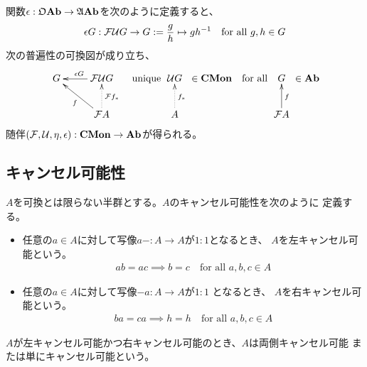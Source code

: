 	関数$\epsilon:{\mathfrak{O}}{\mathbf{Ab}}\to{\mathfrak{A}}{\mathbf{Ab}}$を次のように定義すると、
	\begin{equation*}\begin{split}
		\epsilon G: {\mathcal{F}}{\mathcal{U}} G\to G := \frac{g}{h} \mapsto gh^{-1} 
		\quad\text{for all } g,h\in G
	\end{split}\end{equation*}
	次の普遍性の可換図が成り立ち、
	\begin{equation*}\begin{split}
		\xymatrix{
			G \ar@{<-}[r]^{\epsilon G} \ar@{<-}[rd]_f 
			& \clF\clU G \ar@{<.}[d]^{\clF f_*} \\
			& \clF A
		} \quad\text{unique } \xymatrix{
			\clU G \ar@{<.}[d]^{f_*} \\ A
		}\in\cat{CMon} \quad\text{for all } \xymatrix{
			G\ar@{<-}[d]^f \\ \clF A
		}\in\cat{Ab}
	\end{split}\end{equation*}
	随伴$({\mathcal{F}},{\mathcal{U}},\eta,\epsilon):{\mathbf{CMon}}\to{\mathbf{Ab}}$が得られる。

\subsection{キャンセル可能性}\label{s2:キャンセル可能性} %
	\begin{definition}[キャンセル可能な半群]\label{def:キャンセル可能な半群} %
		$A$を可換とは限らない半群とする。$A$のキャンセル可能性を次のように
		定義する。
		\begin{itemize}\setlength{\itemsep}{-1mm} %
			\item 任意の$a\in A$に対して写像$a-:A\to A$が$1:1$となるとき、
			$A$を左キャンセル可能という。
			\begin{equation*}\begin{split}
				ab=ac\implies b=c \quad\text{for all } a,b,c\in A
			\end{split}\end{equation*}
			\item 任意の$a\in A$に対して写像$-a:A\to A$が$1:1$ となるとき、
			$A$を右キャンセル可能という。
			\begin{equation*}\begin{split}
				ba=ca\implies h=h \quad\text{for all } a,b,c\in A
			\end{split}\end{equation*}
		\end{itemize} %
		$A$が左キャンセル可能かつ右キャンセル可能のとき、$A$は両側キャンセル可能
		または単にキャンセル可能という。\EOP
	\end{definition} %

